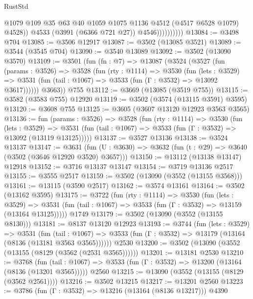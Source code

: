 \begin{lexlean}{RustStd}
\begin{coremodule}
                            @1079
                            @109
                            @35
                            @63
                            @40
                            @1059
                            @1075
                            @1136
                            @4512
                            (@4517 @6528 @1079)
                            @4528))
                        @4533
                        (@3991 (@6366 @721 @27))
                        @4546))))))))))
@13084 := @3498 @704
@13085 := @3506 @12917
@13087 := @3502 (@13085 @3521)
@13089 := @3544 (@3545 @704)
@13090 := @3540 @13089
@13092 := @3502 (@13090 @3570)
@13109 := @3501
    (fun (fn : @7) =>
    @13087
      (@3524
        (@3527
          (fun (params : @3526) =>
          @3528
            (fun (rty : @1114) =>
            @3530
              (fun (lets : @3529) =>
              @3531 (fun (tail : @1067) => @3533 (fun (Γ : @3532) => @13092 @3617))))))
        @3663))
    @755
@13112 := @3669 (@13085 (@3519 @755))
@13115 := @3582 (@3583 @755) @12920
@13119 := @3502 (@3574 (@13115 @3591) @3595)
@13120 := @3608 @755
@13125 := @3605 (@3607 @13120 @12923 @3563 @3565)
@13136 := fun (params : @3526) =>
  @3528
    (fun (rty : @1114) =>
    @3530
      (fun (lets : @3529) =>
      @3531 (fun (tail : @1067) => @3533 (fun (Γ : @3532) => @13092 (@13119 @13125)))))
@13137 := @3527 @13136
@13138 := @3524 @13137
@13147 := @3631
    (fun (U : @3630) => @3632 (fun (t : @29) => @3640 (@3502 (@3646 @12920 @3520) @3657)))
@13150 := @13112 (@13138 @13147) @12918
@13152 := @3716 @13137 @13147
@13154 := @3719 @13136 @2517
@13155 := @3555 @2517
@13159 := @3502 (@13090 (@3552 (@13155 @3568)))
@13161 := @13115 (@3590 @2517)
@13162 := @3574 @13161
@13164 := @3502 (@13162 @3595)
@13175 := @3722
    (fun (rty : @1114) =>
    @3530
      (fun (lets : @3529) =>
      @3531 (fun (tail : @1067) => @3533 (fun (Γ : @3532) => @13159 (@13164 @13125)))))
    @1749
@13179 := @3502 (@13090 (@3552 (@13155 @8130)))
@13181 := @8137 @13120 @12923
@13193 := @3744
    (fun (lets : @3529) =>
    @3531
      (fun (tail : @1067) =>
      @3533 (fun (Γ : @3532) => @13179 (@13164 (@8136 (@13181 @3563 @3565))))))
    @2530
@13200 := @3502 (@13090 (@3552 (@13155 (@8129 (@3562 (@2531 @3565))))))
@13201 := @13181 @2530
@13210 := @3768
    (fun (tail : @1067) => @3533 (fun (Γ : @3532) => @13200 (@13164 (@8136 (@13201 @3565)))))
    @2560
@13215 := @13090 (@3552 (@13155 (@8129 (@3562 @2561))))
@13216 := @3502 @13215
@13217 := @13201 @2560
@13223 := @3786 (fun (Γ : @3532) => @13216 (@13164 (@8136 @13217))) @4390

\end{coremodule}
\end{lexlean}
